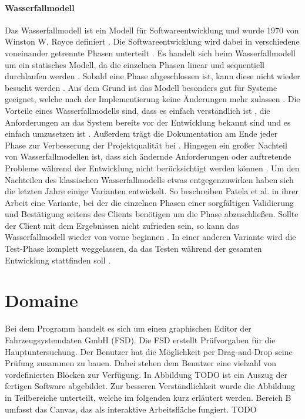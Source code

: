     \paragraph{Wasserfallmodell}
    Das Wasserfallmodell ist ein Modell für Softwareentwicklung \cite{24} und wurde 1970 von Winston W. Royce definiert \cite{25}. 
    Die Softwareentwicklung wird dabei in verschiedene voneinander getrennte Phasen unterteilt \cite{22}.
    Es handelt sich beim Wasserfallmodell um ein statisches Modell, da die einzelnen Phasen linear und sequentiell durchlaufen werden \cite{22}.
    Sobald eine Phase abgeschlossen ist, kann diese nicht wieder besucht werden \cite{22}. 
    Aus dem Grund ist das Modell besonders gut für Systeme geeignet, welche nach der Implementierung keine Änderungen mehr zulassen \cite{22}. 
    Die Vorteile eines Wasserfallmodells sind, dass es einfach verständlich ist \cite{22}, die Anforderungen an das System bereits vor der Entwicklung bekannt sind und es einfach umzusetzen ist \cite{23}.
    Außerdem trägt die Dokumentation am Ende jeder Phase zur Verbesserung der Projektqualität bei \cite{23}.
    Hingegen ein großer Nachteil von Wasserfallmodellen ist, dass sich ändernde Anforderungen oder auftretende Probleme während der Entwicklung nicht berücksichtigt werden können \cite{23}.
    Um den Nachteilen des klassischen Wasserfallmodells etwas entgegenzuwirken haben sich die letzten Jahre einige Varianten entwickelt.
    So beschreiben Patela et al. in ihrer Arbeit eine Variante, bei der die einzelnen Phasen einer sorgfältigen Validierung und Bestätigung seitens des Clients benötigen um die Phase abzuschließen. 
    Sollte der Client mit dem Ergebnissen nicht zufrieden sein, so kann das Wasserfallmodell wieder von vorne beginnen \cite{24}. 
    In einer anderen Variante wird die Test-Phase komplett weggelassen, da das Testen während der gesamten Entwicklung stattfinden soll \cite{25}.
    \section{Domaine}
    Bei dem Programm handelt es sich um einen graphischen Editor der Fahrzeugsystemdaten GmbH (FSD).
    Die FSD erstellt Prüfvorgaben für die Hauptuntersuchung.
    Der Benutzer hat die Möglichkeit per Drag-and-Drop seine Prüfung zusammen zu bauen.
    Dabei stehen dem Benutzer eine vielzahl von vordefinierten Blöcken zur Verfügung.
    In Abbildung TODO ist ein Auszug der fertigen Software abgebildet.
    Zur besseren Verständlichkeit wurde die Abbildung in Teilbereiche unterteilt, welche im folgenden kurz erläutert werden.
    Bereich B umfasst das Canvas, das als interaktive Arbeitsfläche fungiert.
    TODO
    \newpage
